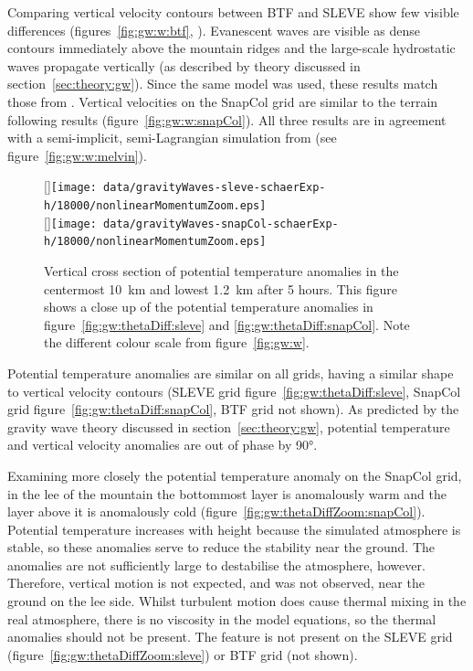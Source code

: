Comparing vertical velocity contours between BTF and SLEVE show few visible differences (figures~\ref{fig:gw:w:btf}, ).  Evanescent waves are visible as dense contours immediately above the mountain ridges and the large-scale hydrostatic waves propagate vertically (as described by theory discussed in section~\ref{sec:theory:gw}).  Since the same model was used, these results match those from \textcite{weller-shahrokhi2014}.  Vertical velocities on the SnapCol grid are similar to the terrain following results (figure~\ref{fig:gw:w:snapCol}).  All three results are in agreement with a semi-implicit, semi-Lagrangian simulation from \textcite{melvin2010} (see figure~\ref{fig:gw:w:melvin}).

\begin{figure}
	\captionsetup[subfigure]{position=b}
	\centering
	[\textwidth]{\texttt{[image: data/gravityWaves-sleve-schaerExp-h/18000/nonlinearMomentumZoom.eps]}} \\
	[\textwidth]{\texttt{[image: data/gravityWaves-snapCol-schaerExp-h/18000/nonlinearMomentumZoom.eps]}}
	\caption{Vertical cross section of potential temperature anomalies in the centermost \SI{10}{\kilo\meter} and lowest \SI{1.2}{\kilo\meter} after 5 hours.  This figure shows a close up of the potential temperature anomalies in figure~\ref{fig:gw:thetaDiff:sleve} and \ref{fig:gw:thetaDiff:snapCol}.  Note the different colour scale from figure~\ref{fig:gw:w}. }
	\label{fig:gw:thetaDiffZoom}
\end{figure}

Potential temperature anomalies are similar on all grids, having a similar shape to vertical velocity contours (SLEVE grid figure~\ref{fig:gw:thetaDiff:sleve}, SnapCol grid figure~\ref{fig:gw:thetaDiff:snapCol}, BTF grid not shown).  As predicted by the gravity wave theory discussed in section~\ref{sec:theory:gw}, potential temperature and vertical velocity anomalies are out of phase by \ang{90}.

Examining more closely the potential temperature anomaly on the SnapCol grid, in the lee of the mountain the bottommost layer is anomalously warm and the layer above it is anomalously cold (figure~\ref{fig:gw:thetaDiffZoom:snapCol}).  Potential temperature increases with height because the simulated atmosphere is stable, so these anomalies serve to reduce the stability near the ground.  The anomalies are not sufficiently large to destabilise the atmosphere, however.   Therefore, vertical motion is not expected, and was not observed, near the ground on the lee side.   Whilst turbulent motion does cause thermal mixing in the real atmosphere, there is no viscosity in the model equations, so the thermal anomalies should not be present.  The feature is not present on the SLEVE grid (figure~\ref{fig:gw:thetaDiffZoom:sleve}) or BTF grid (not shown).

